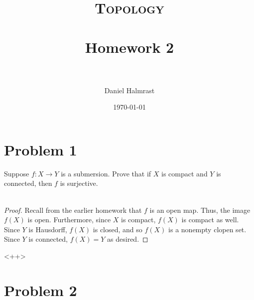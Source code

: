 \documentclass[fontsize=11pt]{scrartcl} %
\title{	
\normalfont \normalsize 
\textsc{Topology} \\ [25pt] %
\horrule{0.5pt} \\[0.4cm] %
\huge Homework 2 \\ %
\horrule{2pt} \\[0.5cm] %
}
\author{Daniel Halmrast} %
\date{\normalsize\today} %
\numberwithin{equation}{section} %
\numberwithin{figure}{section} %
\numberwithin{table}{section} %
\begin{document}
\maketitle %

\section*{Problem 1}
Suppose $f:X\to Y$ is a submersion. Prove that if $X$ is compact and $Y$ is
connected, then $f$ is surjective.
\\
\\
\begin{proof}
    Recall from the earlier homework that $f$ is an open map. Thus, the image
    $f(X)$ is open. Furthermore, since $X$ is compact, $f(X)$ is compact as
    well. Since $Y$ is Hausdorff, $f(X)$ is closed, and so $f(X)$ is a nonempty
    clopen set. Since $Y$ is connected, $f(X)=Y$ as desired.
\end{proof}<++>

\section*{Problem 2}
\end{document}
